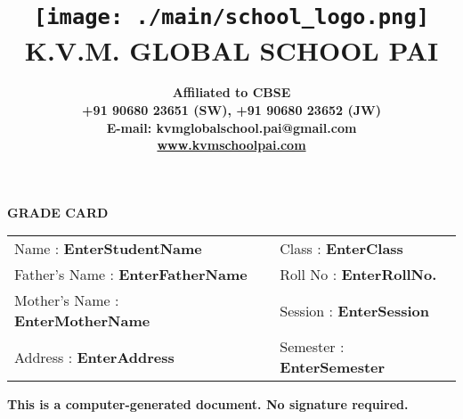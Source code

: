 \documentclass[12 pt]{article}
\title{\texttt{[image: ./main/school\_logo.png]}\\{\Huge \bf K.V.M. GLOBAL SCHOOL PAI}}
\author{
	{\bf
	Affiliated to CBSE\\
	+91 90680 23651 (SW), +91 90680 23652 (JW)\\
	E-mail: kvmglobalschool.pai@gmail.com\\
	\href{www.kvmschoolpai.com}{www.kvmschoolpai.com}}
}
\date{}
\begin{document}
\maketitle
{}
\noindent
\begin{center}
{\bf \Large GRADE CARD}
\end{center}
\vspace*{0.5 cm}
\begin{center}
{\large
	\begin{tabular}{lll}
		Name : {\bf EnterStudentName} &  & Class : {\bf EnterClass}     \\
		Father's Name : {\bf EnterFatherName}  &  & Roll No : {\bf EnterRollNo.} \\
		Mother's Name : {\bf EnterMotherName}  &  & Session : {\bf EnterSession}    \\
		Address : {\bf EnterAddress}       &  & Semester : {\bf EnterSemester}  
	\end{tabular}}
\end{center}
\vspace{0.4cm}
\noindent
\hfill {\bf This is a computer-generated document. No signature required.}
\end{document}
